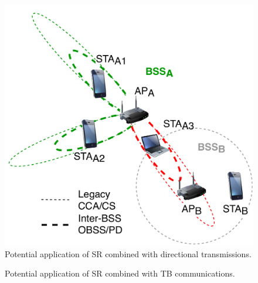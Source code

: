 \documentclass[preprint,12pt]{elsarticle}
\begin{document}
\begin{figure}[ht!]
	\centering        
	\includegraphics[width=0.4\columnwidth]{sr_and_beamforming}
	\caption{Potential application of SR combined with directional transmissions.}
	\label{fig:sr_and_beamforming}
\end{figure}

\begin{figure}[ht!]
	\centering        
	\caption{Potential application of SR combined with TB communications.}        
	\label{fig:sr_and_tb}
\end{figure}
\end{document}

